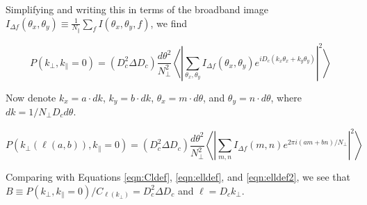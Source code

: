 \documentclass{emulateapj}
\begin{document}
Simplifying and writing this in terms of the broadband image $I_{\Delta f}(\theta_x,\theta_y)\equiv\frac{1}{N_\parallel}\sum_f  I(\theta_x,\theta_y,f)$, we find

\begin{equation}
P(k_\perp,k_\parallel=0) =(D_c^2 \Delta D_c)
\frac{d\theta^2}{N_\perp^2}\left\langle\left|\sum_{\theta_x,\theta_y}I_{\Delta f}(\theta_x,\theta_y)e^{iD_c(k_x\theta_x+k_y\theta_y)}\right|^2\right\rangle
\end{equation}

Now denote $k_x=a\cdot dk$, $k_y=b\cdot dk$, $\theta_x=m\cdot d\theta$, and $\theta_y=n\cdot d\theta$, where $dk = 1/N_\perp D_c d\theta$. 

\begin{equation}
P(k_\perp(\ell(a,b)),k_\parallel=0) =(D_c^2 \Delta D_c)
\frac{d\theta^2}{N_\perp^2}\left\langle\left|\sum_{m,n}I_{\Delta f}(m,n)e^{2\pi i(am + bn)/N_\perp}\right|^2\right\rangle
\end{equation}

Comparing with Equations \ref{eqn:Cldef}, \ref{eqn:elldef}, and \ref{eqn:elldef2}, we see that $B\equiv P(k_\perp,k_\parallel=0)/ C_{\ell(k_\perp)}=D_c^2 \Delta D_c$ and $\ell=D_c k_\perp$.




%

\end{document}
